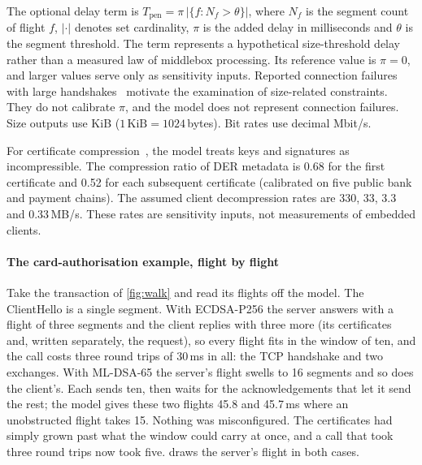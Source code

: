 \documentclass[preprint,12pt]{elsarticle}
\newcommand{\ms}{\,ms\xspace}
\begin{document}
The optional delay term is $T_\mathrm{pen}=\pi\,\bigl|\{f:N_f>\theta\}\bigr|$, where $N_f$ is the segment count of flight $f$, $|\cdot|$ denotes set cardinality, $\pi$ is the added delay in milliseconds and $\theta$ is the segment threshold. The term represents a hypothetical size-threshold delay rather than a measured law of middlebox processing. Its reference value is $\pi=0$, and larger values serve only as sensitivity inputs. Reported connection failures with large handshakes~\cite{westerbaan2021} motivate the examination of size-related constraints. They do not calibrate $\pi$, and the model does not represent connection failures. Size outputs use KiB ($1\,\mathrm{KiB}=1024$\,bytes). Bit rates use decimal Mbit/s.

For certificate compression~\cite{rfc8879}, the model treats keys and signatures as incompressible. The compression ratio of DER metadata is 0.68 for the first certificate and 0.52 for each subsequent certificate (calibrated on five public bank and payment chains). The assumed client decompression rates are 330, 33, 3.3 and 0.33\,MB/s. These rates are sensitivity inputs, not measurements of embedded clients.

\paragraph{The card-authorisation example, flight by flight} Take the transaction of \cref{fig:walk} and read its flights off the model. The ClientHello is a single segment. With ECDSA-P256 the server answers with a flight of three segments and the client replies with three more (its certificates and, written separately, the request), so every flight fits in the window of ten, and the call costs three round trips of 30\ms in all: the TCP handshake and two exchanges. With ML-DSA-65 the server's flight swells to 16 segments and so does the client's. Each sends ten, then waits for the acknowledgements that let it send the rest; the model gives these two flights 45.8 and 45.7\ms where an unobstructed flight takes 15. Nothing was misconfigured. The certificates had simply grown past what the window could carry at once, and a call that took three round trips now took five.  draws the server's flight in both cases.
\end{document}

